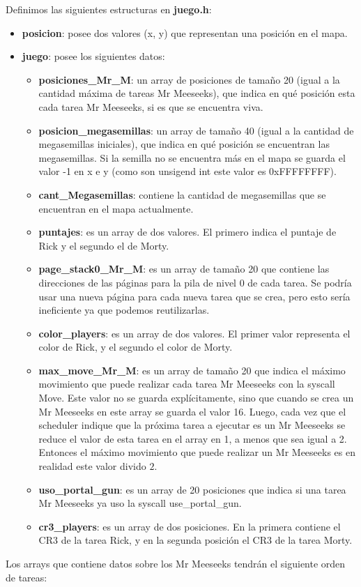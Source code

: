 \documentclass[a4paper]{article}
\begin{document}
\justify
Definimos las siguientes estructuras en \textbf{juego.h}:
\begin{itemize}
	\item \textbf{posicion}: posee dos valores (x, y) que representan una posición en el mapa.
	\item \textbf{juego}: posee los siguientes datos:
	\begin{itemize}
		\item \textbf{posiciones_Mr_M}: un array de posiciones de tamaño 20 (igual a la cantidad máxima de tareas Mr Meeseeks), que indica en qué posición esta cada tarea Mr Meeseeks, si es que se encuentra viva.
		\item \textbf{posicion_megasemillas}: un array de tamaño 40 (igual a la cantidad de megasemillas iniciales), que indica en qué posición se encuentran las megasemillas. Si la semilla no se encuentra más en el mapa se guarda el valor -1 en x e y (como son unsigend int este valor es 0xFFFFFFFF).
		\item \textbf{cant_Megasemillas}: contiene la cantidad de megasemillas que se encuentran en el mapa actualmente.
		\item \textbf{puntajes}: es un array de dos valores. El primero indica el puntaje de Rick y el segundo el de Morty.
		\item \textbf{page_stack0_Mr_M}: es un array de tamaño 20 que contiene las direcciones de las páginas para la pila de nivel 0 de cada tarea. Se podría usar una nueva página para cada nueva tarea que se crea, pero esto sería ineficiente ya que podemos reutilizarlas.
		\item \textbf{color_players}: es un array de dos valores. El primer valor representa el color de Rick, y el segundo el color de Morty.
		\item \textbf{max_move_Mr_M}: es un array de tamaño 20 que  indica el máximo movimiento que puede realizar cada tarea Mr Meeseeks con la syscall Move. Este valor no se guarda explícitamente, sino que cuando se crea un Mr Meeseeks en este array se guarda el valor 16. Luego, cada vez que el scheduler indique que la próxima tarea a ejecutar es un Mr Meeseeks se reduce el valor de esta tarea en el array en 1, a menos que sea igual a 2. Entonces el máximo movimiento que puede realizar un Mr Meeseeks es en realidad este valor divido $2$.
		\item \textbf{uso_portal_gun}: es un array de 20 posiciones que indica si una tarea Mr Meeseeks ya uso la syscall use_portal_gun.
		\item \textbf{cr3_players}: es un array de dos posiciones. En la primera contiene el CR3 de la tarea Rick, y en la segunda posición el CR3 de la tarea Morty.
	\end{itemize}
\end{itemize}
Los arrays que contiene datos sobre los Mr Meeseeks tendrán el siguiente orden de tareas:
\end{document}
